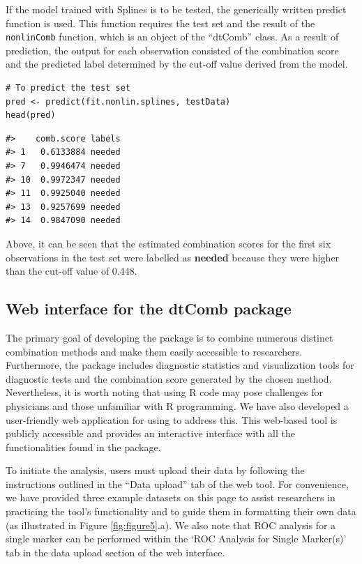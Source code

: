 If the model trained with Splines is to be tested, the generically written predict function is used. This function requires the test set and the result of the \texttt{nonlinComb} function, which is an object of the ``dtComb'' class. As a result of prediction, the output for each observation consisted of the combination score and the predicted label determined by the cut-off value derived from the model.

\begin{verbatim}
# To predict the test set
pred <- predict(fit.nonlin.splines, testData)
head(pred)
\end{verbatim}

\begin{verbatim}
#>    comb.score labels
#> 1   0.6133884 needed
#> 7   0.9946474 needed
#> 10  0.9972347 needed
#> 11  0.9925040 needed
#> 13  0.9257699 needed
#> 14  0.9847090 needed
\end{verbatim}

Above, it can be seen that the estimated combination scores for the first six observations in the test set were labelled as \textbf{needed} because they were higher than the cut-off value of 0.448.

\subsection{Web interface for the dtComb package}\label{web-interface-for-the-dtcomb-package}

The primary goal of developing the  package is to combine numerous distinct combination methods and make them easily accessible to researchers. Furthermore, the package includes diagnostic statistics and visualization tools for diagnostic tests and the combination score generated by the chosen method. Nevertheless, it is worth noting that using R code may pose challenges for physicians and those unfamiliar with R programming. We have also developed a user-friendly web application for  using  \citep{chang2017shiny} to address this. This web-based tool is publicly accessible and provides an interactive interface with all the functionalities found in the  package.

To initiate the analysis, users must upload their data by following the instructions outlined in the ``Data upload'' tab of the web tool. For convenience, we have provided three example datasets on this page to assist researchers in practicing the tool's functionality and to guide them in formatting their own data (as illustrated in Figure \ref{fig:figure5}.a). We also note that ROC analysis for a single marker can be performed within the `ROC Analysis for Single Marker(s)' tab in the data upload section of the web interface.

